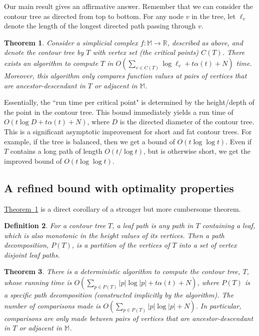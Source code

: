 \documentclass[11pt]{article}
\newtheorem{theorem}{Theorem}[section]
\newtheorem{definition}[theorem]{Definition}
\theoremstyle{definition}
\newcommand{\MM}{\mathbb{M}}
\newcommand{\RR}{\mathbb{R}}
\newcommand{\Thm}[1]{\hyperref[thm:#1]{Theorem~\ref*{thm:#1}}} %
\begin{document}
Our main result gives an affirmative answer. Remember that we can consider
the contour tree as directed from top to bottom. For any node $v$ in the tree, let $\ell_v$ denote the length of the 
longest directed path passing through $v$. 

\begin{theorem} \label{thm:main-corr} Consider a simplicial complex $f:\MM \to \RR$, described as above, and denote
the contour tree by $T$ with vertex set (the critical points) $C(T)$. There exists an algorithm to compute $T$
in $O(\sum_{v \in C(T)} \log \ell_v + t\alpha(t) + N)$ time. Moreover, this algorithm only
compares function values at pairs of vertices that are ancestor-descendant in $T$ or adjacent in $\MM$.
\end{theorem}

Essentially, the ``run time per critical point" is determined by the height/depth of the point in the contour tree.
This bound immediately yields a run time of $O(t\log D + t\alpha(t) + N)$,
where $D$ is the directed diameter of the contour tree. 
This is a significant asymptotic improvement for short and fat contour trees. For example, if the tree is balanced,
then we get a bound of $O(t\log\log t)$.
Even if $T$ contains a long path of length $O(t/\log t)$, but is otherwise short, we get the improved bound of $O(t\log\log t)$.

\subsection{A refined bound with optimality properties}\label{sec:more-refined}

\Thm{main-corr} is a direct corollary of a stronger but more cumbersome theorem.



\begin{definition}
\label{def:path} 
For a contour tree $T$, a \emph{leaf path} is any path in $T$ containing a leaf, 
which is also monotonic in the height values of its vertices. 
Then a \emph{path decomposition}, $P(T)$, is a partition of the vertices of $T$ into a set of vertex disjoint leaf paths.  
\end{definition}

\begin{theorem} 
\label{thm:main-alg} 
There is a deterministic algorithm to compute the contour tree, $T$, whose running time is $O(\sum_{p \in P(T)} |p|\log |p| + t\alpha(t) + N)$,
where $P(T)$ is a specific path decomposition (constructed implicitly by the algorithm).
The number of comparisons made is $O(\sum_{p \in P(T)} |p|\log |p| + N)$.
In particular, comparisons are only made between pairs of vertices that are ancestor-descendant in $T$ or adjacent in $\MM$.
\end{theorem}
\end{document}
